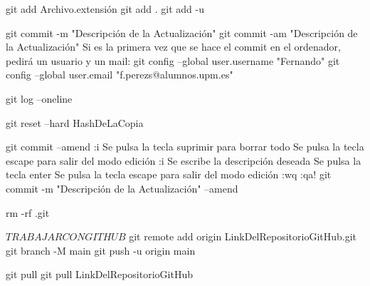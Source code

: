 	git add Archivo.extensión	%
	git add .					%
	git add -u					%

	git commit -m "Descripción de la Actualización"		%
	git commit -am "Descripción de la Actualización"	%
		Si es la primera vez que se hace el commit en el ordenador, pedirá un usuario y un mail:
			git config --global user.username "Fernando"
			git config --global user.email "f.perezs@alumnos.upm.es"

	git log --oneline	%

	git reset --hard HashDeLaCopia	%

	git commit --amend		%
		:i		%
		Se pulsa la tecla suprimir para borrar todo
		Se pulsa la tecla escape para salir del modo edición
		:i		%
		Se escribe la descripción deseada
		Se pulsa la tecla enter
		Se pulsa la tecla escape para salir del modo edición
		:wq		%
		:qa!	%
	git commit -m "Descripción de la Actualización" --amend		%

	rm -rf .git %

$ TRABAJAR CON GITHUB $
	git remote add origin LinkDelRepositorioGitHub.git		%
	git branch -M main
	git push -u origin main									%

	git pull							%
	git pull LinkDelRepositorioGitHub	%

